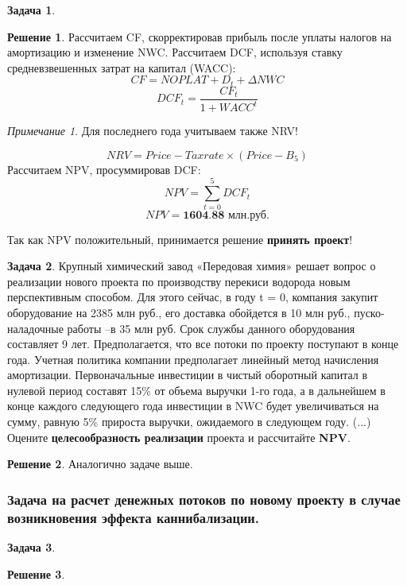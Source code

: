 \documentclass[a4paper, 14pt]{article}
\theoremstyle{plain} %
\theoremstyle{definition} %
\newtheorem*{solution}{Решение}
\newtheorem{problem}{Задача}[subsection]
\theoremstyle{remark} %
\newtheorem{nota}{Примечание}
\begin{document}
\begin{problem}
\begin{solution}
Рассчитаем CF, скорректировав прибыль после уплаты налогов на амортизацию и изменение NWC. Рассчитаем DCF, используя ставку средневзвешенных затрат на капитал (WACC):
\[CF = NOPLAT + D_{t} + \Delta NWC \]
\[DCF_{t} = \frac{CF_{t}}{1 + WACC^{t}}\]
\begin{nota}
	Для последнего года учитываем также NRV!
\end{nota}
\[NRV = Price - Taxrate \times (Price - B_{5})\]
Рассчитаем NPV, просуммировав DCF:
	\[NPV = \sum_{t=0}^{5} DCF_{t} \]
	\[NPV = \textbf{1604.88 млн.руб.}\]

Так как NPV положительный, принимается решение \textbf{принять проект}!
    \end{solution}
\end{problem}

\begin{problem}
    Крупный  химический  завод  «Передовая  химия»  решает  вопрос  о  реализации нового проекта по производству перекиси водорода новым перспективным способом. Для этого сейчас, в году t = 0, компания закупит оборудование на 2385 млн руб., его доставка обойдется в 10 млн руб., пуско-наладочные работы –в 35 млн руб. Срок службы данного оборудования составляет 9 лет. Предполагается, что все потоки по проекту поступают в конце  года. Учетная  политика  компании  предполагает  линейный  метод  начисления амортизации. Первоначальные инвестиции в чистый оборотный капитал в нулевой период составят 15\% от объема выручки 1-го года, а в дальнейшем в конце каждого следующего года инвестиции в NWC будет увеличиваться на сумму, равную 5\% прироста выручки, ожидаемого в следующем году. (...)
	Оцените \textbf{целесообразность реализации} проекта и рассчитайте \textbf{NPV}.
    \begin{solution}
		Аналогично задаче выше.
    \end{solution}
\end{problem}

\subsubsection{Задача на расчет денежных потоков по новому проекту в случае возникновения эффекта каннибализации.}

\begin{problem}
    \begin{solution}

    \end{solution}
\end{problem}
\end{document}
